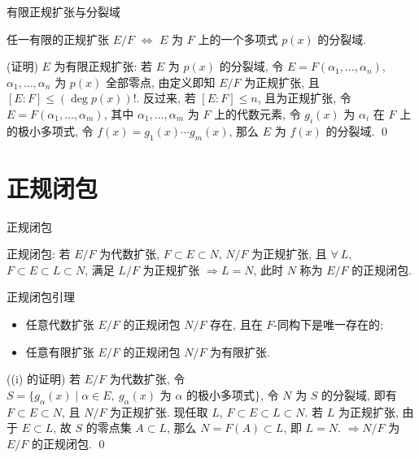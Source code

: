 \begin{frame}{有限正规扩张与分裂域}

\begin{cor}[有限正规扩张与分裂域]
任一有限的正规扩张 $E/F$ $\iff$ $E$ 为 $F$ 上的一个多项式 $p(x)$ 的分裂域.
\end{cor}

\startproof[bg=yellow, fg=red](证明)
$E$ 为有限正规扩张:
若 $E$ 为 $p(x)$ 的分裂域, 令 $E = F(\alpha_1, \dots, \alpha_n)$,
$\alpha_1, \dots, \alpha_n$ 为 $p(x)$ 全部零点,
由定义即知 $E/F$ 为正规扩张, 且 $[E:F] \leq (\deg p(x))!$.
反过来, 若 $[E:F] \leq n$, 且为正规扩张,
令 $E = F(\alpha_1, \dots, \alpha_m)$, 其中 $\alpha_1, \dots, \alpha_m$
为 $F$ 上的代数元素,
令 $g_i(x)$ 为 $\alpha_i$ 在 $F$ 上的极小多项式,
令 $f(x) = g_1(x) \dotsm g_m(x)$, 那么 $E$ 为 $f(x)$ 的分裂域.
\qed

\end{frame}


\section[闭包2]{正规闭包}


\begin{frame}{正规闭包}

正规闭包: 若 $E/F$ 为代数扩张, $F \subset E \subset N$, $N/F$ 为正规扩张,
且 $\forall\ L$, $F \subset E \subset L \subset N$,
满足 $L/F$ 为正规扩张 $\Longrightarrow L = N$,
此时 $N$ 称为 $E/F$ 的正规闭包.

\end{frame}


\begin{frame}{正规闭包引理}

\begin{lem}[正规闭包]
\begin{itemize}
\item[(i)] 任意代数扩张 $E/F$ 的正规闭包 $N/F$ 存在,
  且在 $F$-同构下是唯一存在的;
\item[(ii)] 任意有限扩张 $E/F$ 的正规闭包 $N/F$ 为有限扩张.
\end{itemize}
\end{lem}

\startproof[bg=yellow, fg=red]((i) 的证明)
若 $E/F$ 为代数扩张, 令
$S = \{ g_{\alpha}(x) \mid \alpha \in E,\ g_{\alpha}(x) \text{ 为 } \alpha \text{ 的极小多项式} \}$,
令 $N$ 为 $S$ 的分裂域, 即有 $F \subset E \subset N$, 且 $N/F$ 为正规扩张.
现任取 $L$, $F \subset E \subset L \subset N$.
若 $L$ 为正规扩张, 由于 $E \subset L$, 故 $S$ 的零点集 $A \subset L$,
那么 $N = F(A) \subset L$, 即 $L = N$.
$\Longrightarrow N/F$ 为 $E/F$ 的正规闭包.
\qed

\end{frame}

